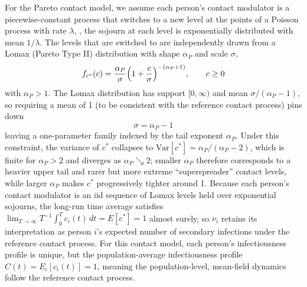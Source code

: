 For the Pareto contact model, we assume each person's contact modulator is a piecewise-constant process that switches to a new level at the points of a Poisson process with rate $\lambda$, \ie, the sojourn at each level is exponentially distributed with mean $1/\lambda$. The levels that are switched to are independently drawn from a Lomax (Pareto Type II) distribution with shape $\alpha_P$ and scale $\sigma$,
%
\begin{equation}
    f_{c^*}(c) = \frac{\alpha_P}{\sigma}\Bigl(1 + \frac{c}{\sigma}\Bigr)^{-(\alpha_P + 1)}, \qquad c \geq 0
    \label{eq:lomax_pdf}
\end{equation}
%
with $\alpha_P > 1$. The Lomax distribution has support $[0,\infty)$ and mean $\sigma / (\alpha_P - 1)$, so requiring a mean of 1 (to be consistent with the reference contact process) pins down
%
\begin{equation}
    \sigma = \alpha_P - 1
    \label{eq:lomax_scale}
\end{equation}
%
leaving a one-parameter family indexed by the tail exponent $\alpha_P$. Under this constraint, the variance of $c^*$ collapses to $\text{Var}[c^*] = \alpha_P / (\alpha_P - 2)$, which is finite for $\alpha_P > 2$ and diverges as $\alpha_P \searrow 2$; smaller $\alpha_P$ therefore corresponds to a heavier upper tail and rarer but more extreme ``superspreader'' contact levels, while larger $\alpha_P$ makes $c^*$ progressively tighter around 1. Because each person's contact modulator is an iid sequence of Lomax levels held over exponential sojourns, the long-run time average satisfies $\lim_{T \rightarrow \infty} T^{-1} \int_0^T c_i(t) \, dt = E[c^*] = 1$ almost surely, so $\nu_i$ retains its interpretation as person $i$'s expected number of secondary infections under the reference contact process. For this contact model, each person's infectiousness profile is unique, but the population-average infectiousness profile $C(t) = E_i[c_i(t)] = 1$, meaning the population-level, mean-field dynamics follow the reference contact process.

